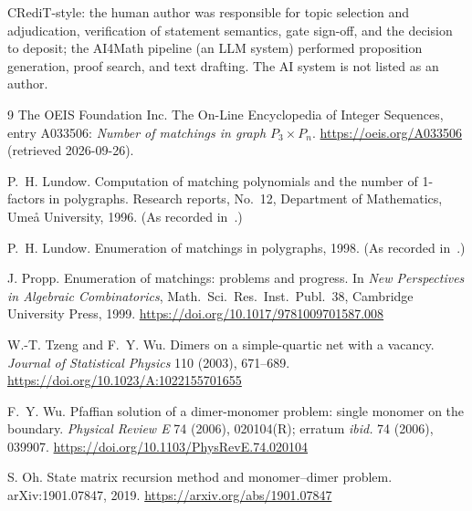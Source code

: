 \documentclass[11pt]{article}
\begin{document}
CRediT-style: the human author was responsible for topic selection and
adjudication, verification of statement semantics, gate sign-off, and the
decision to deposit; the AI4Math pipeline (an LLM system) performed
proposition generation, proof search, and text drafting. The AI system is
not listed as an author.

\begin{thebibliography}{9}
The OEIS Foundation Inc.
\newblock The On-Line Encyclopedia of Integer Sequences, entry A033506:
\emph{Number of matchings in graph $P_3 \times P_n$}.
\newblock \url{https://oeis.org/A033506} (retrieved 2026-09-26).

P.~H. Lundow.
\newblock Computation of matching polynomials and the number of 1-factors in
polygraphs.
\newblock Research reports, No.~12, Department of Mathematics, Ume\r{a}
University, 1996. (As recorded in~\cite{oeis-a033506}.)

P.~H. Lundow.
\newblock Enumeration of matchings in polygraphs, 1998.
\newblock (As recorded in~\cite{oeis-a033506}.)

J. Propp.
\newblock Enumeration of matchings: problems and progress.
\newblock In \emph{New Perspectives in Algebraic Combinatorics},
Math.\ Sci.\ Res.\ Inst.\ Publ.\ 38, Cambridge University Press, 1999.
\newblock \url{https://doi.org/10.1017/9781009701587.008}

W.-T. Tzeng and F.~Y. Wu.
\newblock Dimers on a simple-quartic net with a vacancy.
\newblock \emph{Journal of Statistical Physics} 110 (2003), 671--689.
\newblock \url{https://doi.org/10.1023/A:1022155701655}

F.~Y. Wu.
\newblock Pfaffian solution of a dimer-monomer problem: single monomer on the
boundary.
\newblock \emph{Physical Review E} 74 (2006), 020104(R); erratum
\emph{ibid.} 74 (2006), 039907.
\newblock \url{https://doi.org/10.1103/PhysRevE.74.020104}

S. Oh.
\newblock State matrix recursion method and monomer--dimer problem.
\newblock arXiv:1901.07847, 2019. \url{https://arxiv.org/abs/1901.07847}


\end{thebibliography}
\end{document}

